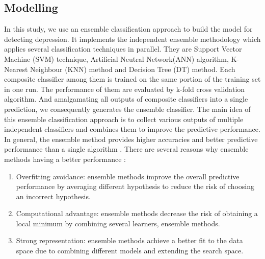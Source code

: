 \documentclass[12pt]{article}
\begin{document}
\medskip

\subsection{Modelling}
In this study, we use an ensemble classification approach to build the model for detecting depression. It implements the independent ensemble methodology which applies several classification techniques in parallel. They are Support Vector Machine (SVM) technique, Artificial Neutral Network(ANN) algorithm, K-Nearest Neighbour (KNN) method and Decision Tree (DT) method. Each composite classifier among them is trained on the same portion of the training set in one run. The performance of them are evaluated by k-fold cross validation algorithm. And amalgamating all outputs of composite classifiers into a single prediction, we consequently generates the ensemble classifier. The main idea of this ensemble classification approach is to collect various outputs of multiple independent classifiers and combines them to improve the predictive performance. 
\\

In general, the ensemble method provides higher accuracies and better predictive performance than a single algorithm \cite{Rokach}. There are several reasons why ensemble methods having a better performance \cite{Sagi}: 
\renewcommand\labelitemii{$\square$}
\begin{enumerate}[label=(\roman*)]
  \item Overfitting avoidance: ensemble methods improve the overall predictive performance by averaging different hypothesis to reduce the risk of choosing an incorrect hypothesis.  
  \item \vspace{3mm} Computational advantage: ensemble methods decrease the risk of obtaining a local minimum by combining several learners, ensemble methods.
  \item \vspace{3mm}Strong representation: ensemble methods achieve a better fit to the data space due to combining different models and extending the search space. 
\end{enumerate}
\end{document}

